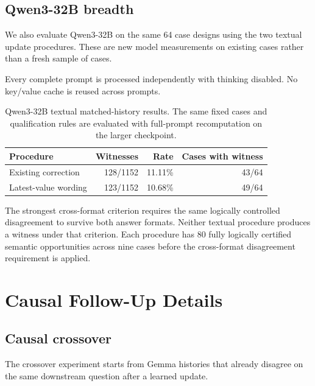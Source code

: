 \documentclass{article}
\begin{document}
\subsection{Qwen3-32B breadth}

We also evaluate Qwen3-32B on the same 64 case designs using the two textual
update procedures. These are new model measurements on existing cases rather
than a fresh sample of cases.

Every complete prompt is processed independently with thinking disabled.
No key/value cache is reused across prompts.

\begin{table}[htbp]
\caption{Qwen3-32B textual matched-history results.
The same fixed cases and qualification rules are evaluated with full-prompt
recomputation on the larger checkpoint.}
\label{tab:qwen32}

\centering
\small
\begin{tabular}{lrrr}
\toprule
Procedure & Witnesses & Rate & Cases with witness \\
\midrule
Existing correction & 128/1152 & 11.11\% & 43/64 \\
Latest-value wording & 123/1152 & 10.68\% & 49/64 \\
\bottomrule
\end{tabular}


\end{table}

The strongest cross-format criterion requires the same logically controlled
disagreement to survive both answer formats. Neither textual procedure
produces a witness under that criterion. Each procedure has 80 fully
logically certified semantic opportunities across nine cases before the
cross-format disagreement requirement is applied.



\section{Causal Follow-Up Details}
\label{app:causal-details}

\subsection{Causal crossover}

The crossover experiment starts from Gemma histories that already disagree
on the same downstream question after a learned update.
\end{document}
